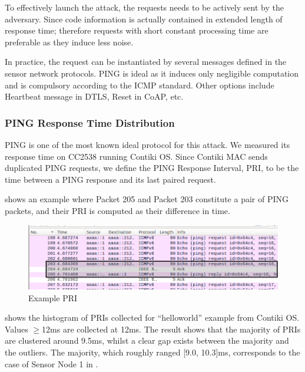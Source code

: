 To effectively launch the attack, the requests needs to be actively sent by the adversary. Since code information is actually contained in extended  length of response time; therefore requests with short constant processing time are preferable as they induce less noise. 

In practice, the request can be instantiated by several messages defined in the sensor network protocols. PING is ideal as it induces only negligible computation and is compulsory according to the ICMP standard\cite{rfc4433}. Other options include Heartbeat message in DTLS\cite{rfc6520}, Reset in CoAP\cite{rfc7252}, etc.

\subsubsection{PING Response Time Distribution}
PING is one of the most known ideal protocol for this attack. We measured its response time on CC2538 running Contiki OS. Since Contiki MAC\cite{ContikiMAC} sends duplicated PING requests, we define the PING Response Interval, PRI, to be the time between a PING response and its last paired request. 

 shows an example where Packet 205 and Packet 203 constitute a pair of PING packets, and their PRI is computed as their difference in time.

\begin{figure}[!h]
	\centering
	\includegraphics[width=\textwidth]{fig/PRI_hl.png}
	\caption{Example PRI\label{ExamplePri}}
\end{figure}


 shows the histogram of PRIs collected for ``helloworld'' example from Contiki OS. Values $\geq$12ms are collected at 12ms. The result shows that the majority of PRIs are clustered around 9.5ms, whilst a clear gap exists between the majority and the outliers. The majority, which roughly ranged [9.0, 10.3]ms, corresponds to the case of Sensor Node 1 in . 

